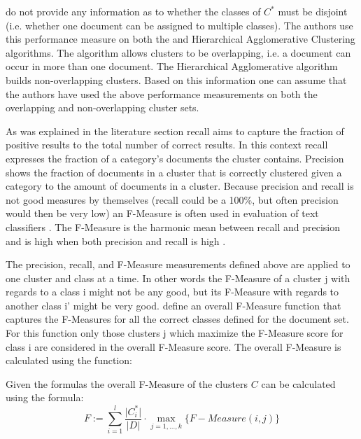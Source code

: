 \cite{Chim2007} do not provide any information as to whether the classes of \(C^*\) must be disjoint (i.e. whether one document can be assigned to multiple classes). The authors use this performance measure on both the \STC and Hierarchical Agglomerative Clustering algorithms. The \STC algorithm allows clusters to be overlapping, i.e. a document can occur in more than one document. The Hierarchical Agglomerative algorithm builds non-overlapping clusters. Based on this information one can assume that the authors have used the above performance measurements on both the overlapping and non-overlapping cluster sets.

As was explained in the literature section recall aims to capture the fraction of positive results to the total number of correct results. In this context recall expresses the fraction of a category's documents the cluster contains. Precision shows the fraction of documents in a cluster that is correctly clustered given a category to the amount of documents in a cluster. Because precision and recall is not good measures by themselves (recall could be a 100\%, but often precision would then be very low) an F-Measure is often used in evaluation of text classifiers \cite{Baeza-Yates2011a}. The F-Measure is the harmonic mean between recall and precision and is high when both precision and recall is high \cite{Baeza-Yates2011b}. 

The precision, recall, and F-Measure measurements defined above are applied to one cluster and class at a time. In other words the F-Measure of a cluster j with regards to a class i might not be any good, but its F-Measure with regards to another class i' might be very good. \cite{Chim2007} define an overall F-Measure function that captures the F-Measures for all the correct classes defined for the document set. For this function only those clusters j which maximize the F-Measure score for class i are considered in the overall F-Measure score. The overall F-Measure is calculated using the function:

Given the formulas the overall F-Measure of the clusters \(C\) can be calculated using the formula:
\begin{displaymath}
F := \sum_{i=1}^{l} \frac{\vert C_i^* \vert}{\vert D \vert} \cdot \max_{j=1,\dots,k} \{F-Measure(i,j)\}
\end{displaymath}

